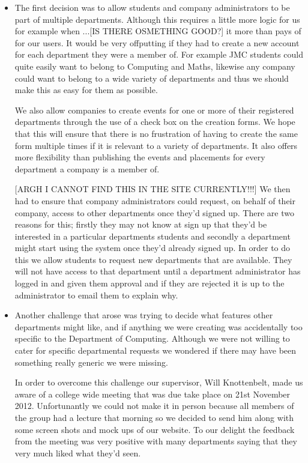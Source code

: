     \begin{itemize}
      \item  The first decision was to allow students and company administrators to be part of multiple departments. Although this requires a little more logic for us for example when ...[IS THERE OSMETHING GOOD?] it more than pays of for our users. It would be very offputting if they had to create a new account for each department they were a member of. For example JMC students could quite easily want to belong to Computing and Maths, likewise any company could want to belong to a wide variety of departments and thus we should make this as easy for them as possible.

      We also allow companies to create events for one or more of their registered departments through the use of a check box on the creation forms. We hope that this will ensure that there is no frustration of having to create the same form multiple times if it is relevant to a variety of departments. It also offers more flexibility than publishing the events and placements for every department a company is a member of.

      [ARGH I CANNOT FIND THIS IN THE SITE CURRENTLY!!!]
      We then had to ensure that company administrators could request, on behalf of their company, access to other departments once they'd signed up. There are two reasons for this; firstly they may not know at sign up that they'd be interested in a particular departments students and secondly a department might start using the system once they'd already signed up. In order to do this we allow students to request new departments that are available. They will not have access to that department until a department administrator has logged in and given them approval and if they are rejected it is up to the administrator to email them to explain why. 
      
      \item Another challenge that arose was trying to decide what features other departments might like, and if anything we were creating was accidentally too specific to the Department of Computing. Although we were not willing to cater for specific departmental requests we wondered if there may have been something really generic we were missing.

      In order to overcome this challenge our supervisor, Will Knottenbelt, made us aware of a college wide meeting that was due take place on 21st November 2012. Unfortunantly we could not make it in person because all members of the group had a lecture that morning so we decided to send him along with some screen shots and mock ups of our website. To our delight the feedback from the meeting was very positive with many departments saying that they very much liked what they'd seen. 
      

\end{itemize}
